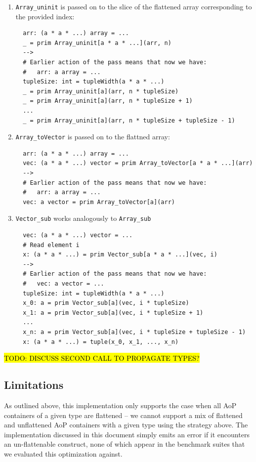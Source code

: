 \documentclass[leqno,11pt]{article}
\begin{document}
\begin{enumerate}
\item \texttt{Array\_uninit} is passed on to the slice of the flattened array
  corresponding to the provided index:

\begin{verbatim}
  arr: (a * a * ...) array = ...
  _ = prim Array_uninit[a * a * ...](arr, n)
  -->
  # Earlier action of the pass means that now we have:
  #   arr: a array = ...
  tupleSize: int = tupleWidth(a * a * ...)
  _ = prim Array_uninit[a](arr, n * tupleSize)
  _ = prim Array_uninit[a](arr, n * tupleSize + 1)
  ...
  _ = prim Array_uninit[a](arr, n * tupleSize + tupleSize - 1)
\end{verbatim}

\item \texttt{Array\_toVector} is passed on to the flattned array:

\begin{verbatim}
  arr: (a * a * ...) array = ...
  vec: (a * a * ...) vector = prim Array_toVector[a * a * ...](arr)
  -->
  # Earlier action of the pass means that now we have:
  #   arr: a array = ...
  vec: a vector = prim Array_toVector[a](arr)
\end{verbatim}

\item \texttt{Vector\_sub} works analogously to \texttt{Array\_sub}

\begin{verbatim}
  vec: (a * a * ...) vector = ...
  # Read element i
  x: (a * a * ...) = prim Vector_sub[a * a * ...](vec, i)
  -->
  # Earlier action of the pass means that now we have:
  #   vec: a vector = ...
  tupleSize: int = tupleWidth(a * a * ...)
  x_0: a = prim Vector_sub[a](vec, i * tupleSize)
  x_1: a = prim Vector_sub[a](vec, i * tupleSize + 1)
  ...
  x_n: a = prim Vector_sub[a](vec, i * tupleSize + tupleSize - 1)
  x: (a * a * ...) = tuple(x_0, x_1, ..., x_n)
\end{verbatim}

\end{enumerate}

\hl{TODO: DISCUSS SECOND CALL TO PROPAGATE TYPES?}

\subsection{Limitations}
As outlined above, this implementation only supports the case when all AoP
containers of a given type are flattened -- we cannot support a mix of flattened
and unflattened AoP containers with a given type using the strategy above. The
implementation discussed in this document simply emits an error if it encounters
an un-flattenable construct, none of which appear in the benchmark suites that
we evaluated this optimization against.
\end{document}
